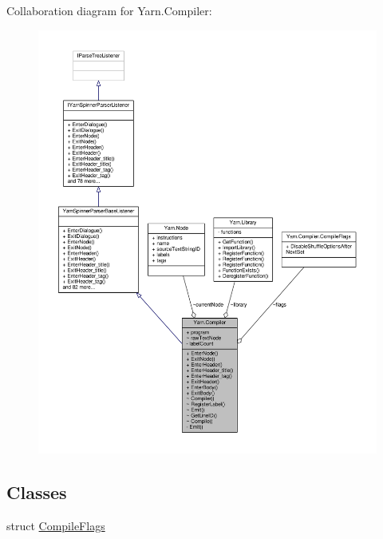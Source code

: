Collaboration diagram for Yarn.\-Compiler\-:
\nopagebreak
\begin{figure}[H]
\begin{center}
\leavevmode
\includegraphics[width=350pt]{a00566}
\end{center}
\end{figure}
\subsection*{Classes}
\begin{DoxyCompactItemize}
\item 
struct \hyperlink{a00053_a00350}{Compile\-Flags}
\end{DoxyCompactItemize}

